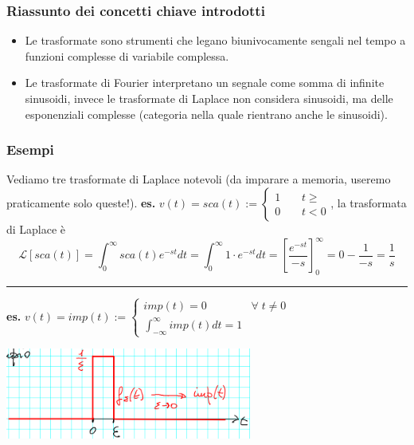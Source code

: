 \subsubsection*{Riassunto dei concetti chiave introdotti}
\begin{itemize}
    \item Le trasformate sono strumenti che legano biunivocamente sengali nel tempo a funzioni complesse di variabile complessa.
    \item Le trasformate di Fourier interpretano un segnale come somma di infinite sinusoidi, invece le trasformate di Laplace non considera sinusoidi, ma delle esponenziali complesse (categoria nella quale rientrano anche le sinusoidi).
\end{itemize}
\subsubsection{Esempi}
Vediamo tre trasformate di Laplace notevoli (da imparare a memoria, useremo praticamente solo queste!).\newline
\newline
\textbf{es.} $v(t) = sca(t) := \begin{cases}
    1 \;\;\;\; &t\geq\\ 0 &t<0 
\end{cases}$, la trasformata di Laplace è
\[
    \mathcal{L}[sca(t)] = \int_{0}^{\infty} sca(t)e^{-st} dt = \int_{0}^{\infty} 1 \cdot e^{-st}dt = \left[\frac{e^{-st}}{-s}\right]_0^\infty = 0 - \frac{1}{-s} = \frac{1}{s}
\]
\rule{\textwidth}{0,4pt}\newline
\newline
\textbf{es.} $v(t) = imp(t) := \begin{cases}
    imp(t)=0 \;\;\;&\forall\;t \neq 0\\
    \int_{-\infty}^{\infty}imp(t) dt =1
\end{cases}$
\begin{center}
    \includegraphics[height=3cm]{../lezione5/img2.PNG}
\end{center}

